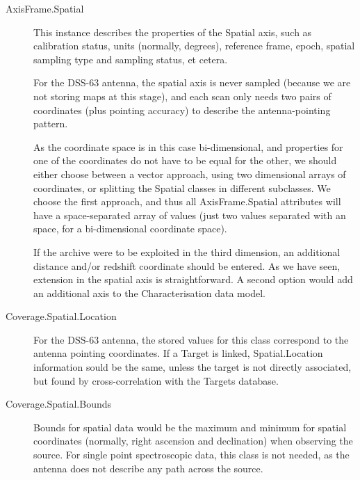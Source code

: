			\begin{description}
				\item[AxisFrame.Spatial] This instance describes
				the properties of the Spatial axis, such as
				calibration status, units (normally, degrees),
				reference frame, epoch, spatial sampling type and
				sampling status, et cetera.
				
				 For the DSS-63 antenna, the spatial axis is never
				sampled (because we are not storing maps at this
				stage), and each scan only needs two pairs of
				coordinates (plus pointing accuracy) to describe
				the antenna-pointing pattern.
				
				
				 As the coordinate space is in this case
				bi-dimensional, and properties for one of the
				coordinates do not have to be equal for the other,
				we should either choose between a vector approach,
				using two dimensional arrays of coordinates, or
				splitting the Spatial classes in different
				subclasses. We choose the first approach, and thus
				all AxisFrame.Spatial attributes will have a
				space-separated array of values (just two values
				separated with an space, for a bi-dimensional
				coordinate space).
				
				 If the archive were to be exploited in the third
				dimension, an additional distance and/or redshift
				coordinate should be entered. As we have seen,
				extension in the spatial axis is straightforward. A
				second option would add an additional axis to the
				Characterisation data model.
				
				 \item[Coverage.Spatial.Location] For the DSS-63
				antenna, the stored values for this class
				correspond to the antenna pointing coordinates.
				If a Target is linked, Spatial.Location information
				sould be the same, unless the target is not directly
				associated, but found by
				cross-correlation with the Targets database.
				
				 \item[Coverage.Spatial.Bounds] Bounds for spatial
				data would be the maximum and minimum for spatial
				coordinates (normally, right ascension and
				declination) when observing the source. For single
				point spectroscopic data, this class is not needed,
				as the antenna does not describe any path across
				the source.
				

\end{description}
